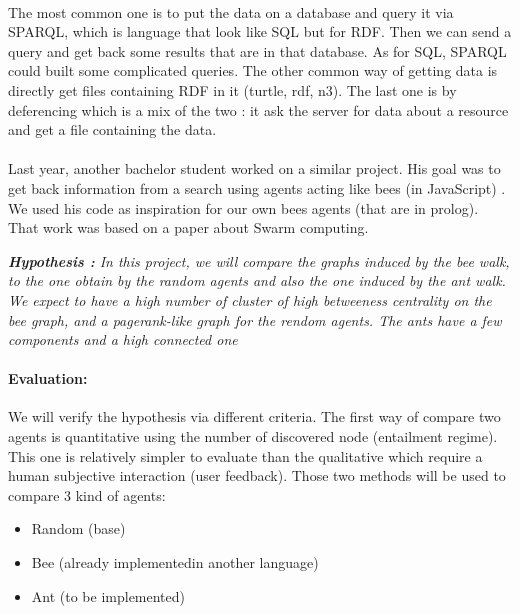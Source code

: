\documentclass{article}
\newenvironment{itemh}[0]{\begin{itemize}[label=$\heartsuit$, font=\color{mygray} \small]}{\end{itemize}}
\begin{document}
	\paragraph{}	%
		The most common one is to put the data on a database and query it via SPARQL,
		which is language that look like SQL but for RDF.
		Then we can send a query and get back some results that are in that database.
		As for SQL, SPARQL could built some complicated queries.
		The other common way of getting data is directly get files containing RDF in it (turtle, rdf, n3).
		The last one is by deferencing which is a mix of the two :
		it ask the server for data about a resource and get a file containing the data.
	\paragraph{}	%
		Last year, another bachelor student worked on a similar project.
		His goal was to get back information from a search using agents acting like bees (in JavaScript) \cite{Kroes13}.
		We used his code as inspiration for our own bees agents (that are in prolog).
		That work was based on a paper \cite{Gueret10} about Swarm computing.
		\begin{center}
			\textit{
			\textbf{Hypothesis :} In this project, we will compare the graphs induced by the bee walk,
				to the one obtain by the random agents and also the one induced by the ant walk.
				We expect to have a high number of cluster of high betweeness centrality on the bee graph,
				and a pagerank-like graph for the rendom agents.
				The ants have a few components and a high connected one}
		\end{center}

		\paragraph{Evaluation:}
			We will verify the hypothesis via different criteria.
			The first way of compare two agents is quantitative using the number of discovered node (entailment regime).
			This one is relatively simpler to evaluate than the qualitative which require a human subjective interaction (user feedback).
			Those two methods will be used to compare 3 kind of agents:
		\begin{itemh}
			\item Random (base)
			\item Bee (already implementedin another language)
			\item Ant (to be implemented)
		\end{itemh}
\end{document}

